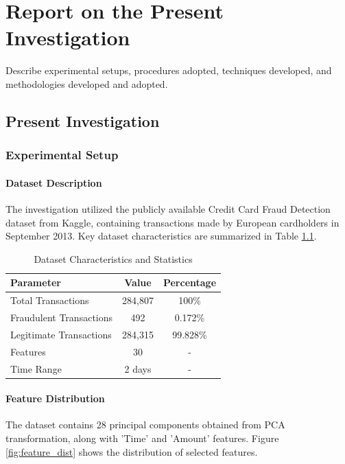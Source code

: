 \chapter{Report on the Present Investigation}
Describe experimental setups, procedures adopted, techniques developed, and methodologies developed and adopted.
	
\section{Present Investigation}

\subsection{Experimental Setup}

\subsubsection{Dataset Description}

The investigation utilized the publicly available Credit Card Fraud Detection dataset from Kaggle, containing transactions made by European cardholders in September 2013. Key dataset characteristics are summarized in Table \ref{tab:dataset_stats}.

\begin{table}[h!]
\centering
\caption{Dataset Characteristics and Statistics}
\label{tab:dataset_stats}
\begin{tabular}{lcc}
\toprule
\textbf{Parameter} & \textbf{Value} & \textbf{Percentage} \\
\midrule
Total Transactions & 284,807 & 100\% \\
Fraudulent Transactions & 492 & 0.172\% \\
Legitimate Transactions & 284,315 & 99.828\% \\
Features & 30 & - \\
Time Range & 2 days & - \\
\bottomrule
\end{tabular}
\end{table}

\subsubsection{Feature Distribution}

The dataset contains 28 principal components obtained from PCA transformation, along with 'Time' and 'Amount' features. Figure \ref{fig:feature_dist} shows the distribution of selected features.

